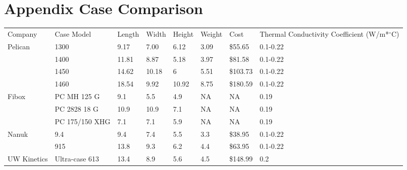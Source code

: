 \section{Appendix Case Comparison}
\begin{table}[h]
\begin{tabular}{lllllllp{3cm}}
Company   & Case Model   & Length & Width & Height & Weight & Cost   & Thermal Conductivity Coefficient (W/m*$^{\circ}$C) \\
Pelican   & 1300      & 9.17  & 7.00 & 6.12  & 3.09  & \$55.65 & 0.1-0.22                       \\
~      & 1400      & 11.81 & 8.87 & 5.18  & 3.97  & \$81.58 & 0.1-0.22                       \\
~      & 1450      & 14.62 & 10.18 & 6   & 5.51  & \$103.73 & 0.1-0.22                       \\
~      & 1460      & 18.54 & 9.92 & 10.92 & 8.75  & \$180.59 & 0.1-0.22                       \\
Fibox    & PC MH 125 G  & 9.1  & 5.5  & 4.9  & NA   & NA    & 0.19                         \\
~      & PC 2828 18 G  & 10.9  & 10.9 & 7.1  & NA   & NA    & 0.19                         \\
~      & PC 175/150 XHG & 7.1  & 7.1  & 5.9  & NA   & NA    & 0.19                         \\
Nanuk    & 9.4      & 9.4  & 7.4  & 5.5  & 3.3  & \$38.95 & 0.1-0.22                       \\
~      & 915      & 13.8  & 9.3  & 6.2  & 4.4  & \$63.95 & 0.1-0.22                       \\
UW Kinetics & Ultra-case 613 & 13.4  & 8.9  & 5.6  & 4.5  & \$148.99 & 0.2                         \\
\end{tabular}
\end{table}